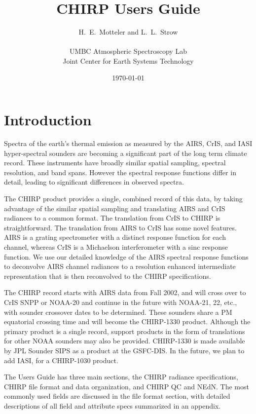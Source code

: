 \documentclass[12pt]{article}
\title{
  CHIRP Users Guide \\
}
\author{H.~E.~Motteler and L.~L.~Strow \\
  \\
  UMBC Atmospheric Spectroscopy Lab \\
  Joint Center for Earth Systems Technology \\
}
\date{\today}
\begin{document}
\maketitle


\section{Introduction}

Spectra of the earth's thermal emission as measured by the AIRS,
CrIS, and IASI hyper-spectral sounders are becoming a significant
part of the long term climate record.  These instruments have
broadly similar spatial sampling, spectral resolution, and band
spans.  However the spectral response functions differ in detail,
leading to significant differences in observed spectra.

The CHIRP product provides a single, combined record of this data,
by taking advantage of the similar spatial sampling and translating
AIRS and CrIS radiances to a common format.  The translation from
CrIS to CHIRP is straightforward.  The translation from AIRS to CrIS
has some novel features.  AIRS is a grating spectrometer with a
distinct response function for each channel, whereas CrIS is a
Michaelson interferometer with a sinc response function.  We use our
detailed knowledge of the AIRS spectral response functions to
deconvolve AIRS channel radiances to a resolution enhanced
intermediate representation that is then reconvolved to the CHIRP
specifications.

The CHIRP record starts with AIRS data from Fall 2002, and will
cross over to CrIS SNPP or NOAA-20 and continue in the future with
NOAA-21, 22, etc., with sounder crossover dates to be determined.
These sounders share a PM equatorial crossing time and will become
the CHIRP-1330 product.  Although the primary product is a single
record, support products in the form of translations for other NOAA
sounders may also be provided.  CHIRP-1330 is made available by JPL
Sounder SIPS as a product at the GSFC-DIS.  In the future, we plan
to add IASI, for a CHIRP-1030 product.

The Users Guide has three main sections, the CHIRP radiance
specifications, CHIRP file format and data organization, and CHIRP
QC and NEdN.  The most commonly used fields are discussed in the
file format section, with detailed descriptions of all field and
attribute specs summarized in an appendix.
\end{document}
